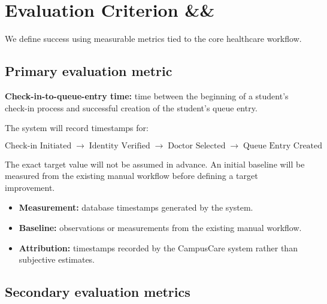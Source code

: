 \documentclass[11pt,a4paper]{article}
\newcommand{\BvrHint}[1]{%
  \ifx&#1&%
  \else
    {\normalfont\normalsize\itshape\hfill #1}%
  \fi}
\begin{document}

\section{Evaluation Criterion %
\BvrHint{}}

We define success using measurable metrics tied to the core healthcare workflow.

\subsection{Primary evaluation metric}

\textbf{Check-in-to-queue-entry time:} time between the beginning of a student's check-in process and successful creation of the student's queue entry.

The system will record timestamps for:

\[
\text{Check-in Initiated}
\;\rightarrow\;
\text{Identity Verified}
\;\rightarrow\;
\text{Doctor Selected}
\;\rightarrow\;
\text{Queue Entry Created}
\]

The exact target value will not be assumed in advance. An initial baseline will be measured from the existing manual workflow before defining a target improvement.

\begin{itemize}

    \item \textbf{Measurement:} database timestamps generated by the system.

    \item \textbf{Baseline:} observations or measurements from the existing manual workflow.

    \item \textbf{Attribution:} timestamps recorded by the CampusCare system rather than subjective estimates.

\end{itemize}

\subsection{Secondary evaluation metrics}
\end{document}

